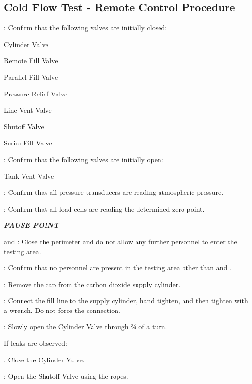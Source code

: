 \subsection{Cold Flow Test - Remote Control Procedure}
\begin{checklist}
    \item \primary{}: Confirm that the following valves are initially closed:
    \begin{checklist}
        \item Cylinder Valve
        \item Remote Fill Valve
        \item Parallel Fill Valve
        \item Pressure Relief Valve
        \item Line Vent Valve
        \item Shutoff Valve
        \item Series Fill Valve
    \end{checklist}
    \item \primary{}: Confirm that the following valves are initially open:
    \item Tank Vent Valve
    \item \daq{}: Confirm that all pressure transducers are reading atmospheric pressure.
    \item \daq{}: Confirm that all load cells are reading the determined zero point.
    \item \textbf{\textit{PAUSE POINT}}
    \item \peri{} and \perii{}: Close the perimeter and do not allow any further personnel to enter the testing area.
    \item \secondary: Confirm that no personnel are present in the testing area other than \primary{} and \secondary.
    \item \primary{}: Remove the cap from the carbon dioxide supply cylinder.
    \item \primary{}: Connect the fill line to the supply cylinder, hand tighten, and then tighten with a wrench. Do not force the connection.
    \item \primary{}: Slowly open the Cylinder Valve through ¾ of a turn.
    \begin{checklist}[label=$\bullet$]
        \item If leaks are observed:
        \begin{checklist}
            \item \primary{}: Close the Cylinder Valve.
            \item \primary{}: Open the Shutoff Valve using the ropes.

\end{checklist}
\end{checklist}
\end{checklist}
